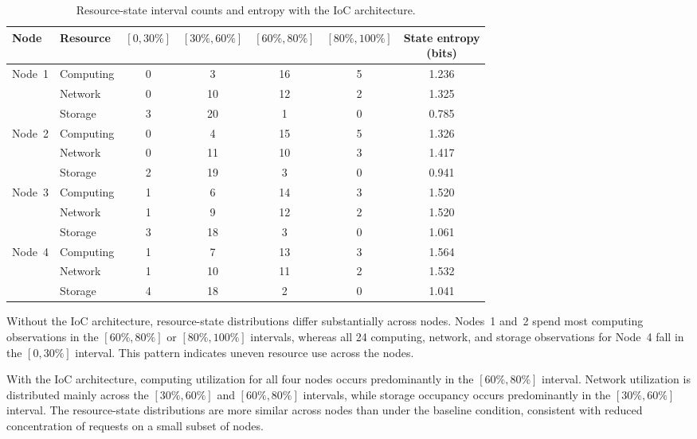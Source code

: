 \documentclass{ccjnl}
\begin{document}
\begin{table}[!t]
	\centering
	\caption{Resource-state interval counts and entropy with the IoC architecture.}
	\label{tab:inference-state-ioc}
	\scriptsize
	\setlength{\tabcolsep}{5pt}
	\renewcommand{\arraystretch}{1.08}
	\begin{tabular*}{\textwidth}{@{\extracolsep{\fill}}llccccc@{}}
		\toprule
		\textbf{Node} & \textbf{Resource}
		& \textbf{$[0,30\%]$}
		& \textbf{$[30\%,60\%]$}
		& \textbf{$[60\%,80\%]$}
		& \textbf{$[80\%,100\%]$}
		& \makecell[c]{\textbf{State entropy}\\\textbf{(bits)}} \\
		\midrule
		\multirow{3}{*}{Node~1}
		& Computing & 0 & 3  & 16 & 5 & 1.236 \\
		& Network   & 0 & 10 & 12 & 2 & 1.325 \\
		& Storage   & 3 & 20 & 1  & 0 & 0.785 \\
		\midrule
		\multirow{3}{*}{Node~2}
		& Computing & 0 & 4  & 15 & 5 & 1.326 \\
		& Network   & 0 & 11 & 10 & 3 & 1.417 \\
		& Storage   & 2 & 19 & 3  & 0 & 0.941 \\
		\midrule
		\multirow{3}{*}{Node~3}
		& Computing & 1 & 6  & 14 & 3 & 1.520 \\
		& Network   & 1 & 9  & 12 & 2 & 1.520 \\
		& Storage   & 3 & 18 & 3  & 0 & 1.061 \\
		\midrule
		\multirow{3}{*}{Node~4}
		& Computing & 1 & 7  & 13 & 3 & 1.564 \\
		& Network   & 1 & 10 & 11 & 2 & 1.532 \\
		& Storage   & 4 & 18 & 2  & 0 & 1.041 \\
		\bottomrule
	\end{tabular*}
\end{table}

Without the IoC architecture, resource-state distributions differ substantially across nodes. Nodes~1 and~2 spend most computing observations in the $[60\%,80\%]$ or $[80\%,100\%]$ intervals, whereas all 24 computing, network, and storage observations for Node~4 fall in the $[0,30\%]$ interval. This pattern indicates uneven resource use across the nodes.

With the IoC architecture, computing utilization for all four nodes occurs predominantly in the $[60\%,80\%]$ interval. Network utilization is distributed mainly across the $[30\%,60\%]$ and $[60\%,80\%]$ intervals, while storage occupancy occurs predominantly in the $[30\%,60\%]$ interval. The resource-state distributions are more similar across nodes than under the baseline condition, consistent with reduced concentration of requests on a small subset of nodes.
\end{document}
